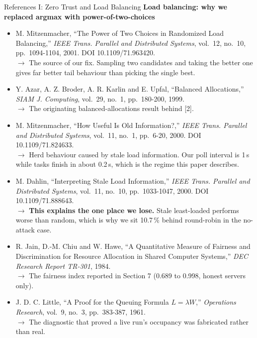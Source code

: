 \documentclass[aspectratio=169, 11pt]{beamer}
\begin{document}
\begin{frame}[allowframebreaks]{References I: Zero Trust and Load Balancing}
    \vspace{3pt}
    \textbf{Load balancing: why we replaced argmax with power-of-two-choices}
    \begin{itemize}\itemsep1.5pt
        \item[{[2]}] M. Mitzenmacher, ``The Power of Two Choices in Randomized Load Balancing,'' \emph{IEEE Trans. Parallel and Distributed Systems}, vol.~12, no.~10, pp.~1094-1104, 2001. DOI 10.1109/71.963420.\\
          {\color{gray}$\rightarrow$ The source of our fix. Sampling two candidates and taking the better one gives far better tail behaviour than picking the single best.}
        \item[{[14]}] Y. Azar, A. Z. Broder, A. R. Karlin and E. Upfal, ``Balanced Allocations,'' \emph{SIAM J. Computing}, vol.~29, no.~1, pp.~180-200, 1999.\\
          {\color{gray}$\rightarrow$ The originating balanced-allocations result behind [2].}
        \item[{[3]}] M. Mitzenmacher, ``How Useful Is Old Information?,'' \emph{IEEE Trans. Parallel and Distributed Systems}, vol.~11, no.~1, pp.~6-20, 2000. DOI 10.1109/71.824633.\\
          {\color{gray}$\rightarrow$ Herd behaviour caused by stale load information. Our poll interval is 1\,s while tasks finish in about 0.2\,s, which is the regime this paper describes.}
        \item[{[4]}] M. Dahlin, ``Interpreting Stale Load Information,'' \emph{IEEE Trans. Parallel and Distributed Systems}, vol.~11, no.~10, pp.~1033-1047, 2000. DOI 10.1109/71.888643.\\
          {\color{gray}$\rightarrow$ \textbf{This explains the one place we lose.} Stale least-loaded performs worse than random, which is why we sit 10.7\,\% behind round-robin in the no-attack case.}
        \item[{[9]}] R. Jain, D.-M. Chiu and W. Hawe, ``A Quantitative Measure of Fairness and Discrimination for Resource Allocation in Shared Computer Systems,'' \emph{DEC Research Report TR-301}, 1984.\\
          {\color{gray}$\rightarrow$ The fairness index reported in Section 7 (0.689 to 0.998, honest servers only).}
        \item[{[20]}] J. D. C. Little, ``A Proof for the Queuing Formula $L = \lambda W$,'' \emph{Operations Research}, vol.~9, no.~3, pp.~383-387, 1961.\\
          {\color{gray}$\rightarrow$ The diagnostic that proved a live run's occupancy was fabricated rather than real.}
    \end{itemize}
\end{frame}
\end{document}
